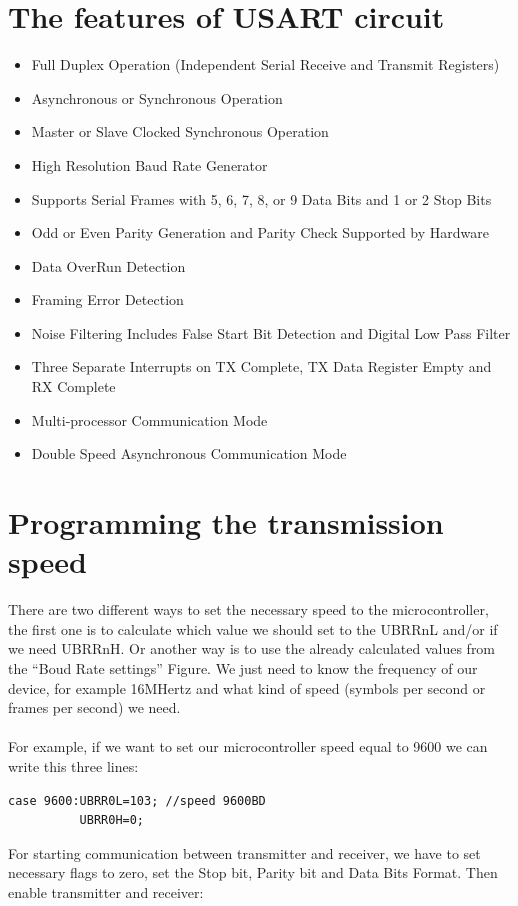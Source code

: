 \documentclass[english]{article}
\begin{document}
\section{The features of USART circuit}
\begin{itemize}
\item Full Duplex Operation (Independent Serial Receive and Transmit Registers)
\item Asynchronous or Synchronous Operation
\item Master or Slave Clocked Synchronous Operation
\item High Resolution Baud Rate Generator
\item Supports Serial Frames with 5, 6, 7, 8, or 9 Data Bits and 1 or 2 Stop Bits
\item Odd or Even Parity Generation and Parity Check Supported by Hardware
\item Data OverRun Detection
\item Framing Error Detection
\item Noise Filtering Includes False Start Bit Detection and Digital Low Pass Filter
\item Three Separate Interrupts on TX Complete, TX Data Register Empty and RX Complete
\item Multi-processor Communication Mode
\item Double Speed Asynchronous Communication Mode
\end{itemize}
\section{Programming the transmission speed}
There are two different ways to set the necessary speed to the microcontroller, the first one is to calculate which value we should set to the UBRRnL and/or if we need UBRRnH. Or another way is to use the already calculated values from the “Boud Rate settings” Figure. We just need to know the frequency of our device, for example 16MHertz and what kind of speed (symbols per second or frames per second) we need.\\\\
For example, if we want to set our microcontroller speed equal to 9600 we can write this three lines:
\begin{lstlisting}
case 9600:UBRR0L=103; //speed 9600BD
		  UBRR0H=0;
\end{lstlisting}
For starting communication between transmitter and receiver, we have to set necessary flags to zero, set the Stop bit, Parity bit and Data Bits Format. Then enable transmitter and receiver:\\\\
\end{document}

